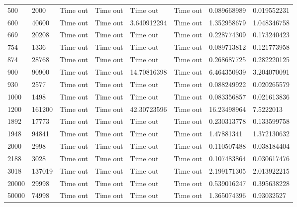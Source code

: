 \begin{longtable}{@{}llllllll@{}}
500       & 2000    & Time out & Time out & Time out       & Time out & 0.089668989 & 0.019552231 \\
600       & 40600   & Time out & Time out & 3.640912294    & Time out & 1.352958679 & 1.048346758 \\
669       & 20208   & Time out & Time out & Time out       & Time out & 0.228774309 & 0.173240423 \\
754       & 1336    & Time out & Time out & Time out       & Time out & 0.089713812 & 0.121773958 \\
874       & 28768   & Time out & Time out & Time out       & Time out & 0.268687725 & 0.282220125 \\
900       & 90900   & Time out & Time out & 14.70816398    & Time out & 6.464350939 & 3.204070091 \\
930       & 2577    & Time out & Time out & Time out       & Time out & 0.088249922 & 0.020265579 \\
1000      & 1498    & Time out & Time out & Time out       & Time out & 0.083356857 & 0.021613836 \\
1200      & 161200  & Time out & Time out & 42.30723596    & Time out & 16.23498964 & 7.5222013   \\
1892      & 17773   & Time out & Time out & Time out       & Time out & 0.230313778 & 0.133599758 \\
1948      & 94841   & Time out & Time out & Time out       & Time out & 1.47881341  & 1.372130632 \\
2000      & 2998    & Time out & Time out & Time out       & Time out & 0.110507488 & 0.038184404 \\
2188      & 3028    & Time out & Time out & Time out       & Time out & 0.107483864 & 0.030617476 \\
3018      & 137019  & Time out & Time out & Time out       & Time out & 2.199171305 & 2.013922215 \\
20000     & 29998   & Time out & Time out & Time out       & Time out & 0.539016247 & 0.395638228 \\
50000     & 74998   & Time out & Time out & Time out       & Time out & 1.365074396 & 0.93032527  \\ \bottomrule
\end{longtable}